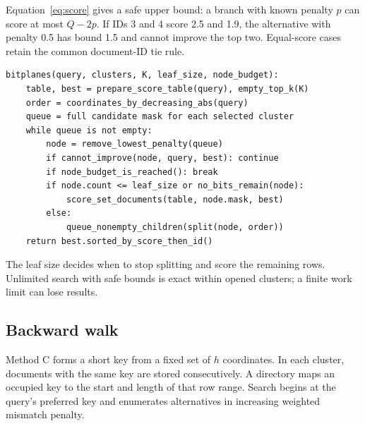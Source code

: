 Equation~\ref{eq:score} gives a safe upper bound: a branch with known penalty $p$ can score at
most $Q-2p$. If IDs 3 and 4 score 2.5 and 1.9, the alternative with penalty 0.5 has bound 1.5 and
cannot improve the top two. Equal-score cases retain the common document-ID tie rule.

\begin{lstlisting}
bitplanes(query, clusters, K, leaf_size, node_budget):
    table, best = prepare_score_table(query), empty_top_k(K)
    order = coordinates_by_decreasing_abs(query)
    queue = full candidate mask for each selected cluster
    while queue is not empty:
        node = remove_lowest_penalty(queue)
        if cannot_improve(node, query, best): continue
        if node_budget_is_reached(): break
        if node.count <= leaf_size or no_bits_remain(node):
            score_set_documents(table, node.mask, best)
        else:
            queue_nonempty_children(split(node, order))
    return best.sorted_by_score_then_id()
\end{lstlisting}
The leaf size decides when to stop splitting and score the remaining rows. Unlimited search
with safe bounds is exact within opened clusters; a finite work limit can lose results.

\newpage
\subsection{Backward walk}
Method C forms a short key from a fixed set of $h$ coordinates. In each cluster, documents
with the same key are stored consecutively. A directory maps an occupied key to the start
and length of that row range. Search begins at the query's preferred key and enumerates
alternatives in increasing weighted mismatch penalty.

